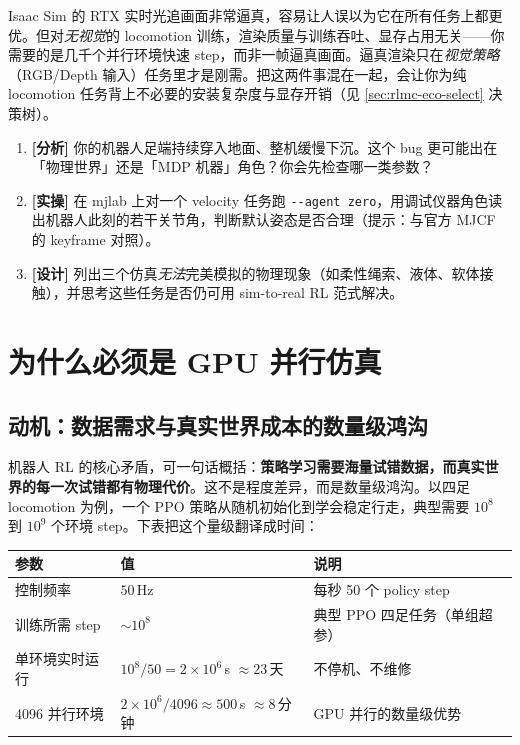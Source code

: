 \begin{pitfall}
Isaac Sim 的 RTX 实时光追画面非常逼真，容易让人误以为它在所有任务上都更优。但对\emph{无视觉}的 locomotion 训练，渲染质量与训练吞吐、显存占用无关——你需要的是几千个并行环境快速 step，而非一帧逼真画面。逼真渲染只在\emph{视觉策略}（RGB/Depth 输入）任务里才是刚需。把这两件事混在一起，会让你为纯 locomotion 任务背上不必要的安装复杂度与显存开销（见 \cref{sec:rlmc-eco-select} 决策树）。
\end{pitfall}

\begin{practice}[练习·三角色]
\begin{enumerate}
  \item \textbf{[分析]} 你的机器人足端持续穿入地面、整机缓慢下沉。这个 bug 更可能出在「物理世界」还是「MDP 机器」角色？你会先检查哪一类参数？
  \item \textbf{[实操]} 在 mjlab 上对一个 velocity 任务跑 \verb|--agent zero|，用调试仪器角色读出机器人此刻的若干关节角，判断默认姿态是否合理（提示：与官方 MJCF 的 keyframe 对照）。
  \item \textbf{[设计]} 列出三个仿真\emph{无法}完美模拟的物理现象（如柔性绳索、液体、软体接触），并思考这些任务是否仍可用 sim-to-real RL 范式解决。
\end{enumerate}
\end{practice}

\section{为什么必须是 GPU 并行仿真}
\label{sec:rlmc-eco-gpu}

\subsection{动机：数据需求与真实世界成本的数量级鸿沟}

机器人 RL 的核心矛盾，可一句话概括：\textbf{策略学习需要海量试错数据，而真实世界的每一次试错都有物理代价}。这不是程度差异，而是数量级鸿沟。以四足 locomotion 为例，一个 PPO 策略从随机初始化到学会稳定行走，典型需要 $10^8$ 到 $10^9$ 个环境 step。下表把这个量级翻译成时间：

\begin{center}
\small
\begin{tabular}{@{}lll@{}}
\toprule
参数 & 值 & 说明 \\
\midrule
控制频率 & $50\,$Hz & 每秒 50 个 policy step \\
训练所需 step & $\sim 10^8$ & 典型 PPO 四足任务（单组超参） \\
单环境实时运行 & $10^8/50=2\times10^6\,$s $\approx 23\,$天 & 不停机、不维修 \\
4096 并行环境 & $2\times10^6/4096\approx 500\,$s $\approx 8\,$分钟 & GPU 并行的数量级优势 \\
\bottomrule
\end{tabular}
\end{center}

